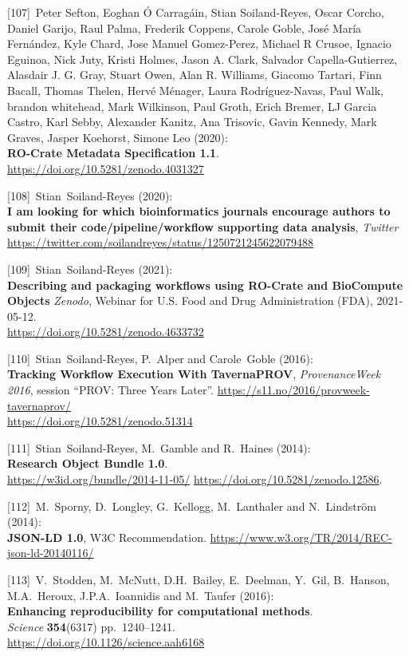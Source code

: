 {[}107{]}~Peter Sefton, Eoghan Ó Carragáin, Stian Soiland-Reyes, Oscar
Corcho, Daniel Garijo, Raul Palma, Frederik Coppens, Carole Goble, José
María Fernández, Kyle Chard, Jose Manuel Gomez-Perez, Michael R Crusoe,
Ignacio Eguinoa, Nick Juty, Kristi Holmes, Jason A. Clark, Salvador
Capella-Gutierrez, Alasdair J. G. Gray, Stuart Owen, Alan R. Williams,
Giacomo Tartari, Finn Bacall, Thomas Thelen, Hervé Ménager, Laura
Rodríguez-Navas, Paul Walk, brandon whitehead, Mark Wilkinson, Paul
Groth, Erich Bremer, LJ Garcia Castro, Karl Sebby, Alexander Kanitz, Ana
Trisovic, Gavin Kennedy, Mark Graves, Jasper Koehorst, Simone Leo
(2020):\\
\textbf{RO-Crate Metadata Specification 1.1}.\\
\url{https://doi.org/10.5281/zenodo.4031327}

{[}108{]}~Stian~Soiland-Reyes (2020):\\
\textbf{I am looking for which bioinformatics journals encourage authors
to submit their code/pipeline/workflow supporting data analysis},
\emph{Twitter}
\url{https://twitter.com/soilandreyes/status/1250721245622079488}

{[}109{]}~Stian~Soiland-Reyes (2021):\\
\textbf{Describing and packaging workflows using RO-Crate and BioCompute
Objects} \emph{Zenodo}, Webinar for U.S. Food and Drug Administration
(FDA), 2021-05-12.\\
\url{https://doi.org/10.5281/zenodo.4633732}

{[}110{]}~Stian~Soiland-Reyes, P.~Alper and Carole~Goble (2016):\\
\textbf{Tracking Workflow Execution With TavernaPROV},
\emph{ProvenanceWeek 2016}, session ``PROV: Three Years Later''.
\url{https://s11.no/2016/provweek-tavernaprov/}\\
\url{https://doi.org/10.5281/zenodo.51314}

{[}111{]}~Stian~Soiland-Reyes, M.~Gamble and R.~Haines (2014):\\
\textbf{Research Object Bundle 1.0}.\\
\url{https://w3id.org/bundle/2014-11-05/}
\url{https://doi.org/10.5281/zenodo.12586}.

{[}112{]}~M.~Sporny, D.~Longley, G.~Kellogg, M.~Lanthaler and
N.~Lindström (2014):\\
\textbf{JSON-LD 1.0}, W3C Recommendation.
\url{https://www.w3.org/TR/2014/REC-json-ld-20140116/}

{[}113{]}~V.~Stodden, M.~McNutt, D.H.~Bailey, E.~Deelman, Y.~Gil,
B.~Hanson, M.A.~Heroux, J.P.A.~Ioannidis and M.~Taufer (2016):\\
\textbf{Enhancing reproducibility for computational methods}.\\
\emph{Science} \textbf{354}(6317) pp.~1240--1241.\\
\url{https://doi.org/10.1126/science.aah6168}

